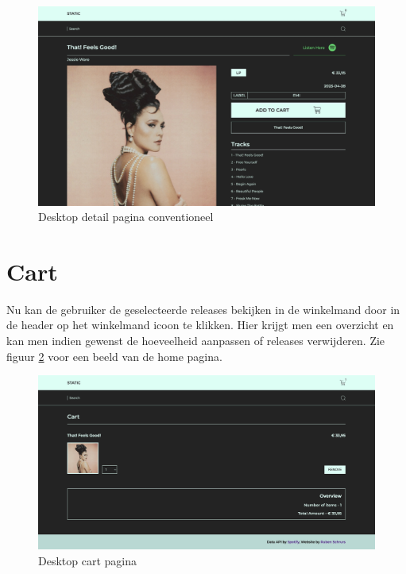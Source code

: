 \begin{figure}
	\centering
	\includegraphics[width=1\linewidth]{graphics/desktopDetailConventioneel}
	\caption[Desktop detail pagina conventioneel]{Desktop detail pagina conventioneel}
	\label{fig:desktopDetailConventioneel}
\end{figure}

\section{Cart}

Nu kan de gebruiker de geselecteerde releases bekijken in de winkelmand door in de header op het winkelmand icoon te klikken. Hier krijgt men een overzicht en kan men indien gewenst de hoeveelheid aanpassen of releases verwijderen. Zie figuur \ref{fig:desktopCart} voor een beeld van de home pagina.

\begin{figure}
	\centering
	\includegraphics[width=1\linewidth]{graphics/desktopCart}
	\caption[Desktop cart pagina]{Desktop cart pagina}
	\label{fig:desktopCart}
\end{figure}

